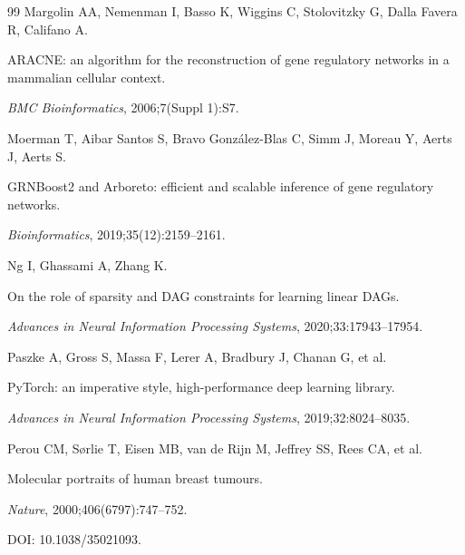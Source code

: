 \documentclass[12pt,a4paper]{article}
\begin{document}
\begin{thebibliography}{99}
Margolin AA, Nemenman I, Basso K, Wiggins C, Stolovitzky G, Dalla Favera R, Califano A.




ARACNE: an algorithm for the reconstruction of gene regulatory networks in a mammalian cellular context.




\textit{BMC Bioinformatics}, 2006;7(Suppl 1):S7.




Moerman T, Aibar Santos S, Bravo Gonz\'{a}lez-Blas C, Simm J, Moreau Y, Aerts J, Aerts S.




GRNBoost2 and Arboreto: efficient and scalable inference of gene regulatory networks.




\textit{Bioinformatics}, 2019;35(12):2159--2161.




Ng I, Ghassami A, Zhang K.




On the role of sparsity and DAG constraints for learning linear DAGs.




\textit{Advances in Neural Information Processing Systems}, 2020;33:17943--17954.




Paszke A, Gross S, Massa F, Lerer A, Bradbury J, Chanan G, et al.




PyTorch: an imperative style, high-performance deep learning library.




\textit{Advances in Neural Information Processing Systems}, 2019;32:8024--8035.




Perou CM, S{\o}rlie T, Eisen MB, van de Rijn M, Jeffrey SS, Rees CA, et al.




Molecular portraits of human breast tumours.




\textit{Nature}, 2000;406(6797):747--752.




DOI: 10.1038/35021093.




\end{thebibliography}
\end{document}
